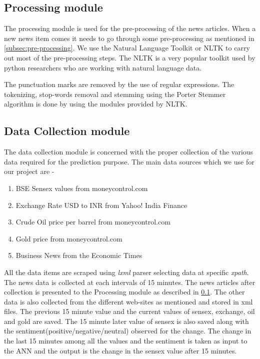 \documentclass[a4paper,12bp]{report}
\begin{document}
\subsection{Processing module}
\label{subsec:proc_module}
The processing module is used for the pre-processing of the news articles. When a new news item comes it needs to go through some pre-processing as mentioned in \ref{subsec:pre-processing}. We use the Natural Language Toolkit \cite{Bird:2009:NLP:1717171} or NLTK to carry out most of the pre-processing steps. The NLTK is a very popular toolkit used by python researchers who are working with natural language data. 

The punctuation marks are removed by the use of regular expressions. The tokenizing, stop-words removal and stemming using the Porter Stemmer algorithm is done by using the modules provided by NLTK. 

\subsection{Data Collection module}
\label{subsec:data_collection}
The data collection module is concerned with the proper collection of the various data required for the prediction purpose. The main data sources which we use for our project are - 
\begin{enumerate}
\item BSE Sensex values from moneycontrol.com \cite{bsesensex}
\item Exchange Rate USD to INR from Yahoo! India Finance \cite{exchange}
\item Crude Oil price per barrel from moneycontrol.com \cite{oil}
\item Gold price from moneycontrol.com \cite{gold}
\item Business News from the Economic Times \cite{news}
\end{enumerate}

All the data items are scraped using \textit{lxml} parser selecting data at specific \textit{xpath}. The news data is collected at each intervals of 15 minutes. The news articles after collection is presented to the Processing module as described in \ref{subsec:proc_module}. The other data is also collected from the different web-sites as mentioned and stored in xml files. The previous 15 minute value and the current values of sensex, exchange, oil and gold are saved. The 15 minute later value of sensex is also saved along with the sentiment(positive/negative/neutral) observed for the change. The change in the last 15 minutes among all the values and the sentiment is taken as input to the ANN and the output is the change in the sensex value after 15 minutes. 
\end{document}
